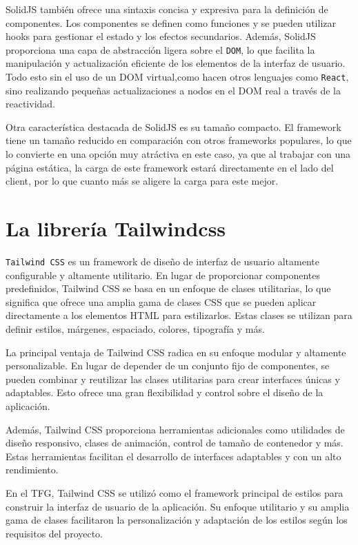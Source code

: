 SolidJS también ofrece una sintaxis concisa y expresiva para la definición de componentes. Los componentes se definen como funciones y se pueden utilizar hooks para gestionar el estado y los efectos secundarios. Además, SolidJS proporciona una capa de abstracción ligera sobre el \verb|DOM|\cite{dom}, lo que facilita la manipulación y actualización eficiente de los elementos de la interfaz de usuario. Todo esto sin el uso de un DOM virtual,como hacen otros lenguajes como \verb|React|\cite{react}, sino realizando pequeñas actualizaciones a nodos en el DOM real a través de la reactividad.

Otra característica destacada de SolidJS es su tamaño compacto. El framework tiene un tamaño reducido en comparación con otros frameworks populares, lo que lo convierte en una opción muy atráctiva en este caso, ya que al trabajar con una página estática, la carga de este framework estará directamente en el lado del client, por lo que cuanto más se aligere la carga para este mejor.

\section{La librería Tailwindcss}
\verb|Tailwind CSS|\cite{tailwind} es un framework de diseño de interfaz de usuario altamente configurable y altamente utilitario. En lugar de proporcionar componentes predefinidos, Tailwind CSS se basa en un enfoque de clases utilitarias, lo que significa que ofrece una amplia gama de clases CSS que se pueden aplicar directamente a los elementos HTML para estilizarlos. Estas clases se utilizan para definir estilos, márgenes, espaciado, colores, tipografía y más.

La principal ventaja de Tailwind CSS radica en su enfoque modular y altamente personalizable. En lugar de depender de un conjunto fijo de componentes, se pueden combinar y reutilizar las clases utilitarias para crear interfaces únicas y adaptables. Esto ofrece una gran flexibilidad y control sobre el diseño de la aplicación.

Además, Tailwind CSS proporciona herramientas adicionales como utilidades de diseño responsivo, clases de animación, control de tamaño de contenedor y más. Estas herramientas facilitan el desarrollo de interfaces adaptables y con un alto rendimiento.

En el TFG, Tailwind CSS se utilizó como el framework principal de estilos para construir la interfaz de usuario de la aplicación. Su enfoque utilitario y su amplia gama de clases facilitaron la personalización y adaptación de los estilos según los requisitos del proyecto.

